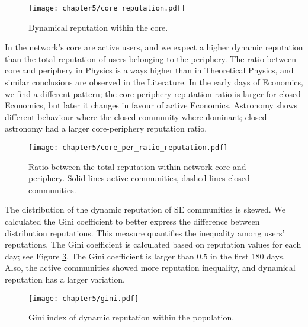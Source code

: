 \begin{figure}[h]
	\centering
	\texttt{[image: chapter5/core\_reputation.pdf]}
	\caption{Dynamical reputation within the core.}
	\label{fig:dr_core}
\end{figure}

In the network's core are active users, and we expect a higher dynamic reputation than the total reputation of users belonging to the periphery. The ratio between core and periphery in Physics is always higher than in Theoretical Physics, and similar conclusions are observed in the Literature. In the early days of Economics, we find a different pattern; the core-periphery reputation ratio is larger for closed Economics, but later it changes in favour of active Economics. Astronomy shows different behaviour where the closed community where dominant; closed astronomy had a larger core-periphery reputation ratio. 

\begin{figure}[h!]
	\centering
	\texttt{[image: chapter5/core\_per\_ratio\_reputation.pdf]}
	\caption[Ratio between the total reputation within network core and periphery.]{Ratio between the total reputation within network core and periphery. Solid lines active communities, dashed lines closed communities.}
	\label{fig:dr_core_per}
\end{figure}

The distribution of the dynamic reputation of SE communities is skewed. We calculated the Gini coefficient to better express the difference between distribution reputations. This measure quantifies the inequality among users’ reputations. The Gini coefficient is calculated based on reputation values for each day; see Figure \ref{fig:dynrep-gini}. The Gini coefficient is larger than $0.5$ in the first 180 days. Also, the active communities showed more reputation inequality, and dynamical reputation has a larger variation. 

\begin{figure}[h]
	\centering
	\texttt{[image: chapter5/gini.pdf]}
	\caption[Gini index of dynamic reputation]{Gini index of dynamic reputation within the population.}
	\label{fig:dynrep-gini}
\end{figure} 

